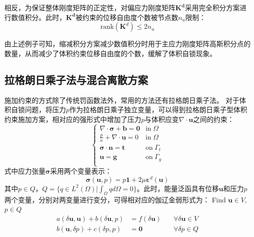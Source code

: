 相反，为保证整体刚度矩阵的正定性，对偏应力刚度矩阵$\boldsymbol{K^d}$采用完全积分方案进行数值积分。此时，$\boldsymbol{K^d}$被约束的位移自由度个数被节点数$n_u$限制：
\begin{equation}
    \mathrm{rank}(\boldsymbol K^d) \le 2n_u
\end{equation}

由上述例子可知，缩减积分方案减少数值积分时用于主应力刚度矩阵高斯积分点的数量，从而减少了体积约束位移自由度的个数，缓解了体积自锁现象。

\subsection{拉格朗日乘子法与混合离散方案}
施加约束的方式除了传统罚函数法外，常用的方法还有拉格朗日乘子法。
对于体积自锁问题，将压力$p$作为拉格朗日乘子独立变量，可以得到拉格朗日乘子型体积约束施加方案，相对应的强形式中增加了压力$p$与体积应变$\nabla \cdot \boldsymbol u$之间的约束：
\begin{equation}\label{strong_mix}
    \begin{cases}
        \nabla \cdot \boldsymbol \sigma + \boldsymbol b = \boldsymbol 0 & \mathrm{in} \; \Omega \\
        \frac{p}{\kappa} + \nabla \cdot \boldsymbol u = 0 & \mathrm{in} \; \Omega \\
        \boldsymbol \sigma \cdot \boldsymbol n = \boldsymbol t & \mathrm{on} \; \Gamma_t \\
        \boldsymbol u = \boldsymbol g & \mathrm{on} \; \Gamma_g \\
    \end{cases}
\end{equation}
式中应力张量$\boldsymbol \sigma$采用两个变量表示：
\begin{equation}\label{stress_mix}
    \boldsymbol \sigma(\boldsymbol u, p) = p \boldsymbol 1 + 2\mu \boldsymbol \varepsilon^d(\boldsymbol u)
\end{equation}
其中$p\in Q$，$Q = \{q \in L^2(\Omega) \vert \int_{\Omega} q d\Omega = 0\}$。此时，能量泛函具有位移$\boldsymbol u$和压力$p$两个变量，分别对两变量进行变分，可得相对应的伽辽金弱形式为：
Find $\boldsymbol u \in V$, $p \in Q$
\begin{equation}\label{ch_2:eq:weak_mix}
    \begin{aligned}
        a(\delta \boldsymbol u, \boldsymbol u) + b(\delta \boldsymbol u, p) &= f(\delta \boldsymbol u) \quad &\forall \delta \boldsymbol u \in V \\
        b(\boldsymbol u, \delta p) +  c(\delta p,p)&= \boldsymbol 0 \quad &\forall \delta p \in Q
    \end{aligned}
\end{equation}
